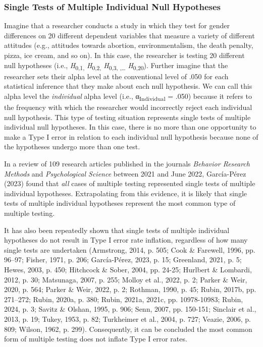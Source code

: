 \documentclass[authordate, empirical]{jote-new-article}
\begin{document}
	\subsubsection{Single Tests of Multiple Individual Null Hypotheses}



	Imagine that a researcher conducts a study in which they test for gender differences on 20 different dependent variables that measure a variety of different attitudes (e.g., attitudes towards abortion, environmentalism, the death penalty, pizza, ice cream, and so on). In this case, the researcher is testing 20 different null hypotheses (i.e., \emph{H}\textsubscript{0,1, }\emph{H}\textsubscript{0,2, }\emph{H}\textsubscript{0,}\textsubscript{3, ,…}\textsubscript{ }\emph{H}\textsubscript{0,20}). Further imagine that the researcher sets their alpha level at the conventional level of .050 for each statistical inference that they make about each null hypothesis. We can call this alpha level the \emph{individual} alpha level (i.e., α\textsubscript{Individual} = .050) because it refers to the frequency with which the researcher would incorrectly reject each individual null hypothesis. This type of testing situation represents single tests of multiple individual null hypotheses. In this case, there is no more than one opportunity to make a Type I error in relation to each individual null hypothesis because none of the hypotheses undergo more than one test.



	In a review of 109 research articles published in the journals \emph{Behavior Research Methods} and \emph{Psychological Science} between 2021 and June 2022, García-Pérez (2023) found that \emph{all} cases of multiple testing represented single tests of multiple individual hypotheses. Extrapolating from this evidence, it is likely that single tests of multiple individual hypotheses represent the most common type of multiple testing.



	It has also been repeatedly shown that single tests of multiple individual hypotheses do not result in Type I error rate inflation, regardless of how many single tests are undertaken (Armstrong, 2014, p. 505; Cook \& Farewell, 1996, pp. 96--97; Fisher, 1971, p. 206; García-Pérez, 2023, p. 15; Greenland, 2021, p. 5; Hewes, 2003, p. 450; Hitchcock \& Sober, 2004, pp. 24-25; Hurlbert \& Lombardi, 2012, p. 30; Matsunaga, 2007, p. 255; Molloy et al., 2022, p. 2; Parker \& Weir, 2020, p. 564; Parker \& Weir, 2022, p. 2; Rothman, 1990, p. 45; Rubin, 2017b, pp. 271--272; Rubin, 2020a, p. 380; Rubin, 2021a, 2021c, pp. 10978-10983; Rubin, 2024, p. 3; Savitz \& Olshan, 1995, p. 906; Senn, 2007, pp. 150-151; Sinclair et al., 2013, p. 19; Tukey, 1953, p. 82; Turkheimer et al., 2004, p. 727; Veazie, 2006, p. 809; Wilson, 1962, p. 299). Consequently, it can be concluded the most common form of multiple testing does not inflate Type I error rates.
\end{document}
